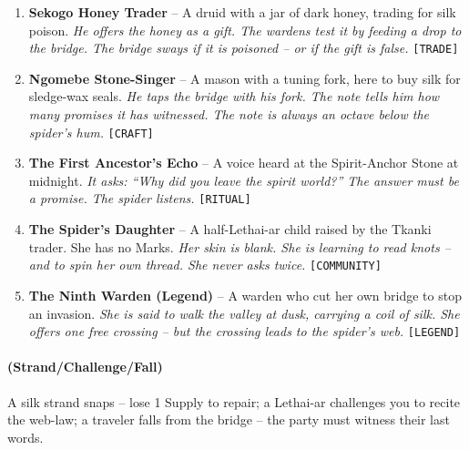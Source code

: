 \begin{enumerate}
\item \textbf{Sekogo Honey Trader} -- A druid with a jar of dark honey, trading for silk poison.
  \hfill \textit{He offers the honey as a gift. The wardens test it by feeding a drop to the bridge. The bridge sways if it is poisoned -- or if the gift is false.} \texttt{[TRADE]}
\item[\card{\heartsuit}{J}] \textbf{Ngomebe Stone-Singer} -- A mason with a tuning fork, here to buy silk for sledge-wax seals.
  \hfill \textit{He taps the bridge with his fork. The note tells him how many promises it has witnessed. The note is always an octave below the spider's hum.} \texttt{[CRAFT]}
\item[\card{\heartsuit}{Q}] \textbf{The First Ancestor's Echo} -- A voice heard at the Spirit-Anchor Stone at midnight.
  \hfill \textit{It asks: ``Why did you leave the spirit world?'' The answer must be a promise. The spider listens.} \texttt{[RITUAL]}
\item[\card{\heartsuit}{K}] \textbf{The Spider's Daughter} -- A half-Lethai-ar child raised by the Tkanki trader. She has no Marks.
  \hfill \textit{Her skin is blank. She is learning to read knots -- and to spin her own thread. She never asks twice.} \texttt{[COMMUNITY]}
\item[\card{\heartsuit}{A}] \textbf{The Ninth Warden (Legend)} -- A warden who cut her own bridge to stop an invasion.
  \hfill \textit{She is said to walk the valley at dusk, carrying a coil of silk. She offers one free crossing -- but the crossing leads to the spider's web.} \texttt{[LEGEND]}
\end{enumerate}

\paragraph*{(Strand/Challenge/Fall)} A silk strand snaps -- lose 1 Supply to repair; a Lethai-ar challenges you to recite the web-law; a traveler falls from the bridge -- the party must witness their last words.

